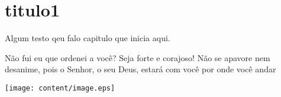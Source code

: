\chapter{titulo1}
Algum testo qeu falo capitulo que inicia aqui.



\begin{slide-frame-center}
Não fui eu que ordenei a você? Seja forte e corajoso! Não se apavore nem desanime, 
pois o Senhor, o seu Deus, estará com você por onde você andar
\end{slide-frame-center}

\begin{slide-frame}
\centering
\texttt{[image: content/image.eps]}
\end{slide-frame}

